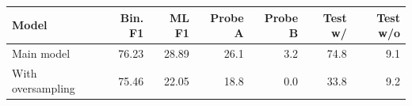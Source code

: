 \begin{tabular}{lrrrrrr}
\toprule
Model & Bin. F1 & ML F1 & Probe A & Probe B & Test w/ & Test w/o \\
\midrule
Main model & 76.23 & 28.89 & 26.1 & 3.2 & 74.8 & 9.1 \\
With oversampling & 75.46 & 22.05 & 18.8 & 0.0 & 33.8 & 9.2 \\
\bottomrule
\end{tabular}
